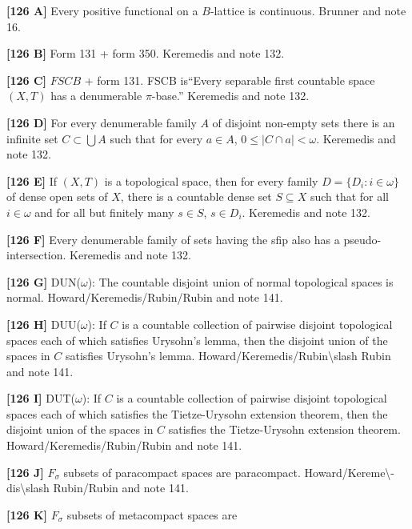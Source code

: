 \smallskip
\item{}{\bf [126 A]} Every positive functional on a $B$-lattice is
continuous. \ac{Brunner} \cite{1984d} and note 16.
\smallskip
\item{}{\bf [126 B]} Form 131 + form 350. \ac{Keremedis} \cite{1999a} and
note 132.
\smallskip
\item{}{\bf [126 C]} $FSCB$ + form 131.
FSCB is``Every separable first countable space $(X,T)$ has a
denumerable $\pi$-base.'' \ac{Keremedis} \cite{1999a} and note 132.
\smallskip
\item{}{\bf [126 D]} For every denumerable family $A$ of disjoint non-empty
sets there is an infinite set $C\subset\bigcup A$ such that for every
$a\in A$, $0\le|C\cap a|<\omega$. \ac{Keremedis} \cite{1999a} and note 132.
\smallskip
\item{}{\bf [126 E]} If $(X,T)$ is a topological space, then for every
family $D=\{D_i: i\in\omega\}$ of dense open sets of
$X$, there is a countable dense set $S\subseteq X$ such that for all
$i\in\omega$ and for all but finitely many $s\in S$, $s\in D_i$.
\ac{Keremedis} \cite{1999a} and note 132.
\smallskip
\item{}{\bf [126 F]} Every denumerable family of sets having
the sfip also has a pseudo-intersection. \ac{Keremedis} \cite{1999a} and
note 132.
\smallskip
\item{}{\bf [126 G]} DUN($\omega$): The countable disjoint union of
normal topological spaces is normal.
\ac{Howard/Keremedis/Rubin/Rubin} \cite{1998a} and note 141.
\smallskip
\item{}{\bf [126 H]} DUU($\omega$): If $C$ is a countable collection
of pairwise disjoint topological spaces each of which satisfies
Urysohn's lemma, then the disjoint union of the
spaces in $C$ satisfies Urysohn's lemma.
\ac{Howard/Keremedis/Rubin\slash Rubin} \cite{1998a} and note 141.
\smallskip
\item{}{\bf [126 I]} DUT($\omega$): If $C$ is a countable collection
of pairwise disjoint topological spaces each of which satisfies
the Tietze-Urysohn extension theorem, then the disjoint union
of the spaces in $C$ satisfies the Tietze-Urysohn extension theorem.
\ac{Howard/Keremedis/Rubin/Rubin} \cite{1998a} and note 141.
\smallskip
\item{}{\bf [126 J]} $F_\sigma$ subsets of paracompact spaces are
paracompact. \ac{Howard/Kereme\-dis\slash Rubin/Rubin} \cite{1997b} and
note 141.
\smallskip
\item{}{\bf [126 K]} $F_\sigma$ subsets of metacompact spaces are
